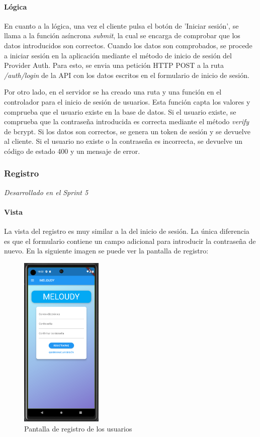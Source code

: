 \paragraph*{Lógica}
En cuanto a la lógica, una vez el cliente pulsa el botón de 'Iniciar sesión', se llama a la función asíncrona \textit{submit}, la cual se encarga de comprobar que los datos introducidos son correctos.
Cuando los datos son comprobados, se procede a iniciar sesión en la aplicación mediante el método de inicio de sesión del Provider Auth. Para esto, se envia una petición HTTP POST a la ruta \textit{/auth/login} de la API con los datos escritos en el formulario de inicio de sesión.

Por otro lado, en el servidor se ha creado una ruta y una función en el controlador para el inicio de sesión de usuarios. Esta función capta los valores y comprueba que el usuario existe en la base de datos. Si el usuario existe, se comprueba que la contraseña introducida es correcta mediante el método \textit{verify} de bcrypt. Si los datos son correctos, se genera un token de sesión y se devuelve al cliente. Si el usuario no existe o la contraseña es incorrecta, se devuelve un código de estado 400 y un mensaje de error.

\subsubsection{Registro}
\textit{Desarrollado en el Sprint 5}
\paragraph*{Vista}
La vista del registro es muy similar a la del inicio de sesión. La única diferencia es que el formulario contiene un campo adicional para introducir la contraseña de nuevo.
En la siguiente imagen se puede ver la pantalla de registro:
\begin{figure}[H]
  \centering
  \includegraphics[width=0.35\textwidth]{imagenes/c7/registro.png}
  \caption{Pantalla de registro de los usuarios}
  \label{fig:register}
\end{figure}
